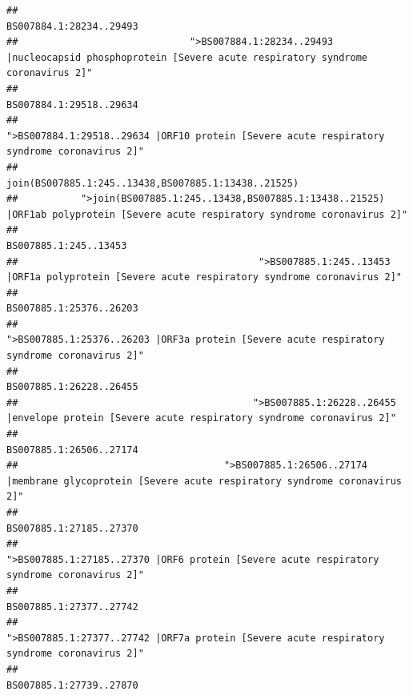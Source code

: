 \documentclass[
]{article}
\begin{document}
\begin{verbatim}
##                                                                                                                BS007884.1:28234..29493 
##                              ">BS007884.1:28234..29493 |nucleocapsid phosphoprotein [Severe acute respiratory syndrome coronavirus 2]" 
##                                                                                                                BS007884.1:29518..29634 
##                                            ">BS007884.1:29518..29634 |ORF10 protein [Severe acute respiratory syndrome coronavirus 2]" 
##                                                                                    join(BS007885.1:245..13438,BS007885.1:13438..21525) 
##           ">join(BS007885.1:245..13438,BS007885.1:13438..21525) |ORF1ab polyprotein [Severe acute respiratory syndrome coronavirus 2]" 
##                                                                                                                  BS007885.1:245..13453 
##                                          ">BS007885.1:245..13453 |ORF1a polyprotein [Severe acute respiratory syndrome coronavirus 2]" 
##                                                                                                                BS007885.1:25376..26203 
##                                            ">BS007885.1:25376..26203 |ORF3a protein [Severe acute respiratory syndrome coronavirus 2]" 
##                                                                                                                BS007885.1:26228..26455 
##                                         ">BS007885.1:26228..26455 |envelope protein [Severe acute respiratory syndrome coronavirus 2]" 
##                                                                                                                BS007885.1:26506..27174 
##                                    ">BS007885.1:26506..27174 |membrane glycoprotein [Severe acute respiratory syndrome coronavirus 2]" 
##                                                                                                                BS007885.1:27185..27370 
##                                             ">BS007885.1:27185..27370 |ORF6 protein [Severe acute respiratory syndrome coronavirus 2]" 
##                                                                                                                BS007885.1:27377..27742 
##                                            ">BS007885.1:27377..27742 |ORF7a protein [Severe acute respiratory syndrome coronavirus 2]" 
##                                                                                                                BS007885.1:27739..27870 

\end{verbatim}
\end{document}
